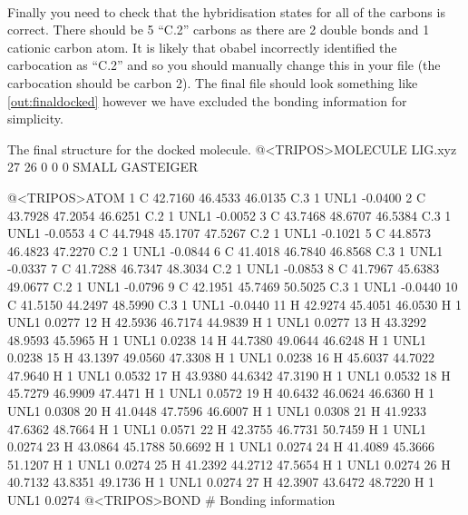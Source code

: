     \paragraph{}
        Finally you need to check that the hybridisation states for all of the carbons is correct. There should be 5 \enquote{C.2} carbons as there are 2 double bonds and 1 cationic carbon atom. It is likely that obabel incorrectly identified the carbocation as \enquote{C.2} and so you should manually change this in your file (the carbocation should be carbon 2). The final file should look something like \cref{out:finaldocked} however we have excluded the bonding information for simplicity.

    \begin{bashoutput}[label=out:finaldocked]{The final structure for the docked molecule.}
@<TRIPOS>MOLECULE
LIG.xyz
 27 26 0 0 0
SMALL
GASTEIGER

@<TRIPOS>ATOM
    1 C  42.7160   46.4533   46.0135 C.3    1  UNL1    -0.0400
    2 C  43.7928   47.2054   46.6251 C.2    1  UNL1    -0.0052
    3 C  43.7468   48.6707   46.5384 C.3    1  UNL1    -0.0553
    4 C  44.7948   45.1707   47.5267 C.2    1  UNL1    -0.1021
    5 C  44.8573   46.4823   47.2270 C.2    1  UNL1    -0.0844
    6 C  41.4018   46.7840   46.8568 C.3    1  UNL1    -0.0337
    7 C  41.7288   46.7347   48.3034 C.2    1  UNL1    -0.0853
    8 C  41.7967   45.6383   49.0677 C.2    1  UNL1    -0.0796
    9 C  42.1951   45.7469   50.5025 C.3    1  UNL1    -0.0440
   10 C  41.5150   44.2497   48.5990 C.3    1  UNL1    -0.0440
   11 H  42.9274   45.4051   46.0530 H      1  UNL1     0.0277
   12 H  42.5936   46.7174   44.9839 H      1  UNL1     0.0277
   13 H  43.3292   48.9593   45.5965 H      1  UNL1     0.0238
   14 H  44.7380   49.0644   46.6248 H      1  UNL1     0.0238
   15 H  43.1397   49.0560   47.3308 H      1  UNL1     0.0238
   16 H  45.6037   44.7022   47.9640 H      1  UNL1     0.0532
   17 H  43.9380   44.6342   47.3190 H      1  UNL1     0.0532
   18 H  45.7279   46.9909   47.4471 H      1  UNL1     0.0572
   19 H  40.6432   46.0624   46.6360 H      1  UNL1     0.0308
   20 H  41.0448   47.7596   46.6007 H      1  UNL1     0.0308
   21 H  41.9233   47.6362   48.7664 H      1  UNL1     0.0571
   22 H  42.3755   46.7731   50.7459 H      1  UNL1     0.0274
   23 H  43.0864   45.1788   50.6692 H      1  UNL1     0.0274
   24 H  41.4089   45.3666   51.1207 H      1  UNL1     0.0274
   25 H  41.2392   44.2712   47.5654 H      1  UNL1     0.0274
   26 H  40.7132   43.8351   49.1736 H      1  UNL1     0.0274
   27 H  42.3907   43.6472   48.7220 H      1  UNL1     0.0274
@<TRIPOS>BOND
 # Bonding information
    \end{bashoutput}